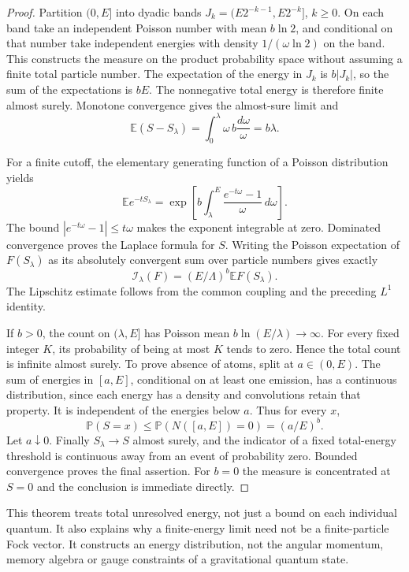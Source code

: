 \begin{proof}
Partition $(0,E]$ into dyadic bands $J_k=(E2^{-k-1},E2^{-k}]$, $k\ge0$. On each band take an independent Poisson number with mean $b\ln2$, and conditional on that number take independent energies with density $1/(\omega\ln2)$ on the band. This constructs the measure on the product probability space without assuming a finite total particle number. The expectation of the energy in $J_k$ is $b|J_k|$, so the sum of the expectations is $bE$. The nonnegative total energy is therefore finite almost surely. Monotone convergence gives the almost-sure limit and
\[
\mathbb E(S-S_\lambda)=\int_0^\lambda\omega\,b\frac{d\omega}{\omega}=b\lambda.
\]

For a finite cutoff, the elementary generating function of a Poisson distribution yields
\[
\mathbb E e^{-tS_\lambda}=\exp\left[b\int_\lambda^E\frac{e^{-t\omega}-1}{\omega}\,d\omega\right].
\]
The bound $|e^{-t\omega}-1|\le t\omega$ makes the exponent integrable at zero. Dominated convergence proves the Laplace formula for $S$. Writing the Poisson expectation of $F(S_\lambda)$ as its absolutely convergent sum over particle numbers gives exactly
\[
\mathcal I_\lambda(F)=(E/\Lambda)^b\mathbb EF(S_\lambda).
\]
The Lipschitz estimate follows from the common coupling and the preceding $L^1$ identity.

If $b>0$, the count on $(\lambda,E]$ has Poisson mean $b\ln(E/\lambda)\to\infty$. For every fixed integer $K$, its probability of being at most $K$ tends to zero. Hence the total count is infinite almost surely. To prove absence of atoms, split at $a\in(0,E)$. The sum of energies in $[a,E]$, conditional on at least one emission, has a continuous distribution, since each energy has a density and convolutions retain that property. It is independent of the energies below $a$. Thus for every $x$,
\[
\mathbb P(S=x)\le\mathbb P(N([a,E])=0)=(a/E)^b.
\]
Let $a\downarrow0$. Finally $S_\lambda\to S$ almost surely, and the indicator of a fixed total-energy threshold is continuous away from an event of probability zero. Bounded convergence proves the final assertion. For $b=0$ the measure is concentrated at $S=0$ and the conclusion is immediate directly.
\end{proof}

This theorem treats total unresolved energy, not just a bound on each individual quantum. It also explains why a finite-energy limit need not be a finite-particle Fock vector. It constructs an energy distribution, not the angular momentum, memory algebra or gauge constraints of a gravitational quantum state.

